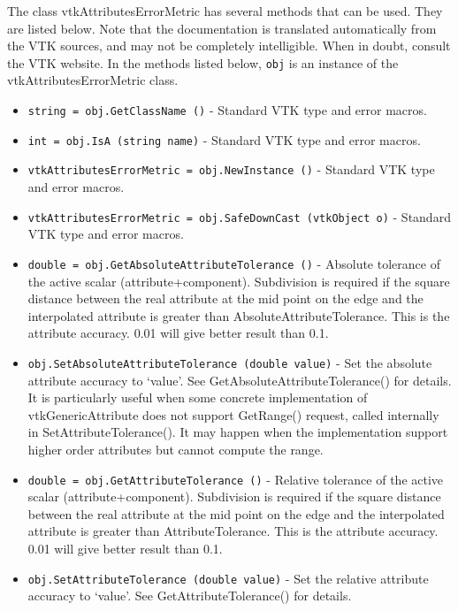 The class vtkAttributesErrorMetric has several methods that can be used.
  They are listed below.
Note that the documentation is translated automatically from the VTK sources,
and may not be completely intelligible.  When in doubt, consult the VTK website.
In the methods listed below, \verb|obj| is an instance of the vtkAttributesErrorMetric class.
\begin{itemize}
\item  \verb|string = obj.GetClassName ()| -  Standard VTK type and error macros.

\item  \verb|int = obj.IsA (string name)| -  Standard VTK type and error macros.

\item  \verb|vtkAttributesErrorMetric = obj.NewInstance ()| -  Standard VTK type and error macros.

\item  \verb|vtkAttributesErrorMetric = obj.SafeDownCast (vtkObject o)| -  Standard VTK type and error macros.

\item  \verb|double = obj.GetAbsoluteAttributeTolerance ()| -  Absolute tolerance of the active scalar (attribute+component).
 Subdivision is required if the square distance between the real attribute
 at the mid point on the edge and the interpolated attribute is greater
 than AbsoluteAttributeTolerance.
 This is the attribute accuracy.
 0.01 will give better result than 0.1.

\item  \verb|obj.SetAbsoluteAttributeTolerance (double value)| -  Set the absolute attribute accuracy to `value'. See
 GetAbsoluteAttributeTolerance() for details.
 It is particularly useful when some concrete implementation of
 vtkGenericAttribute does not support GetRange() request, called
 internally in SetAttributeTolerance(). It may happen when the
 implementation support higher order attributes but
 cannot compute the range.
 

\item  \verb|double = obj.GetAttributeTolerance ()| -  Relative tolerance of the active scalar (attribute+component).
 Subdivision is required if the square distance between the real attribute
 at the mid point on the edge and the interpolated attribute is greater
 than AttributeTolerance.
 This is the attribute accuracy.
 0.01 will give better result than 0.1.

\item  \verb|obj.SetAttributeTolerance (double value)| -  Set the relative attribute accuracy to `value'. See
 GetAttributeTolerance() for details.
 


\end{itemize}
